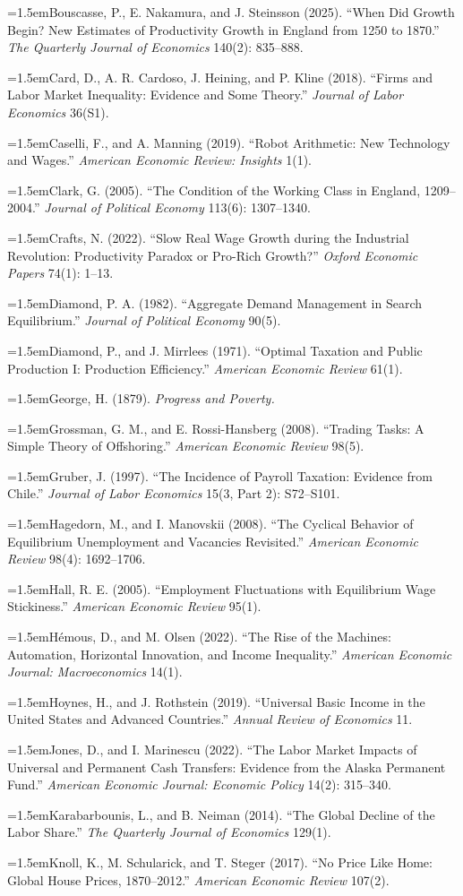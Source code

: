 \documentclass[12pt]{article}
\theoremstyle{plain}
\newcommand{\refentry}[1]{\par\hangindent=1.5em\hangafter=1\noindent #1}
\begin{document}
{\refentry{Bouscasse, P., E. Nakamura, and J. Steinsson (2025). ``When Did Growth Begin? New Estimates of Productivity Growth in England from 1250 to 1870.'' \emph{The Quarterly Journal of Economics} 140(2): 835--888.}
\refentry{Card, D., A. R. Cardoso, J. Heining, and P. Kline (2018). ``Firms and Labor Market Inequality: Evidence and Some Theory.'' \emph{Journal of Labor Economics} 36(S1).}
\refentry{Caselli, F., and A. Manning (2019). ``Robot Arithmetic: New Technology and Wages.'' \emph{American Economic Review: Insights} 1(1).}
\refentry{Clark, G. (2005). ``The Condition of the Working Class in England, 1209--2004.'' \emph{Journal of Political Economy} 113(6): 1307--1340.}
\refentry{Crafts, N. (2022). ``Slow Real Wage Growth during the Industrial Revolution: Productivity Paradox or Pro-Rich Growth?'' \emph{Oxford Economic Papers} 74(1): 1--13.}
\refentry{Diamond, P. A. (1982). ``Aggregate Demand Management in Search Equilibrium.'' \emph{Journal of Political Economy} 90(5).}
\refentry{Diamond, P., and J. Mirrlees (1971). ``Optimal Taxation and Public Production I: Production Efficiency.'' \emph{American Economic Review} 61(1).}
\refentry{George, H. (1879). \emph{Progress and Poverty.}}
\refentry{Grossman, G. M., and E. Rossi-Hansberg (2008). ``Trading Tasks: A Simple Theory of Offshoring.'' \emph{American Economic Review} 98(5).}
\refentry{Gruber, J. (1997). ``The Incidence of Payroll Taxation: Evidence from Chile.'' \emph{Journal of Labor Economics} 15(3, Part 2): S72--S101.}
\refentry{Hagedorn, M., and I. Manovskii (2008). ``The Cyclical Behavior of Equilibrium Unemployment and Vacancies Revisited.'' \emph{American Economic Review} 98(4): 1692--1706.}
\refentry{Hall, R. E. (2005). ``Employment Fluctuations with Equilibrium Wage Stickiness.'' \emph{American Economic Review} 95(1).}
\refentry{Hémous, D., and M. Olsen (2022). ``The Rise of the Machines: Automation, Horizontal Innovation, and Income Inequality.'' \emph{American Economic Journal: Macroeconomics} 14(1).}
\refentry{Hoynes, H., and J. Rothstein (2019). ``Universal Basic Income in the United States and Advanced Countries.'' \emph{Annual Review of Economics} 11.}
\refentry{Jones, D., and I. Marinescu (2022). ``The Labor Market Impacts of Universal and Permanent Cash Transfers: Evidence from the Alaska Permanent Fund.'' \emph{American Economic Journal: Economic Policy} 14(2): 315--340.}
\refentry{Karabarbounis, L., and B. Neiman (2014). ``The Global Decline of the Labor Share.'' \emph{The Quarterly Journal of Economics} 129(1).}
\refentry{Knoll, K., M. Schularick, and T. Steger (2017). ``No Price Like Home: Global House Prices, 1870--2012.'' \emph{American Economic Review} 107(2).}
}
\end{document}
